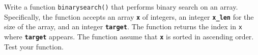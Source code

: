 Write a function \texttt{binarysearch()} that performs binary search on an array. Specifically, the function accepts an array \texttt{\textbf{x}} of integers, an integer \texttt{\textbf{x\_len}} for the size of the array, and an integer \texttt{\textbf{target}}. The function returns the index in \texttt{x} where \texttt{\textbf{target}} appears. The function assume that \texttt{\textbf{x}} is sorted in ascending order. Test your function.


